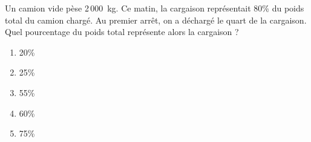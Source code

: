 Un camion vide pèse 2\,000~kg. Ce matin, la cargaison représentait
80\% du poids total du camion chargé. Au premier arrêt, on a déchargé le quart de la cargaison. Quel pourcentage du poids total représente alors la cargaison ?
\begin{multicols}{5}
  \begin{enumerate}[A/]
  \item 20\%
  \item 25\%
  \item 55\%
  \item 60\%
  \item 75\%
  \end{enumerate}
\end{multicols}